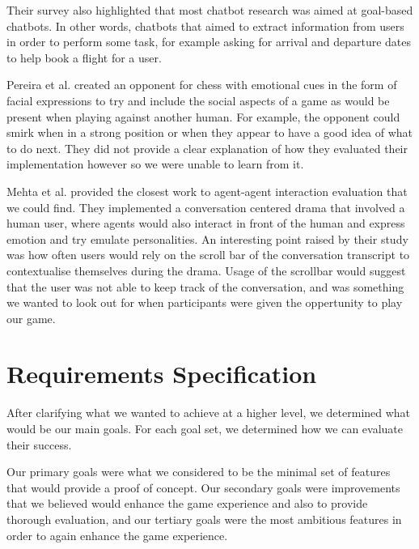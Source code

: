 \documentclass{article}
\begin{document}
Their survey also highlighted that most chatbot research was aimed at goal-based chatbots. In other words, chatbots that aimed to extract information from users in order to perform some task, for example asking for arrival and departure dates to help book a flight for a user. 

Pereira et al. \cite{pervchess} created an opponent for chess with emotional cues in the form of facial expressions to try and include the social aspects of a game as would be present when playing against another human. For example, the opponent could smirk when in a strong position or when they appear to have a good idea of what to do next. They did not provide a clear explanation of how they evaluated their implementation however so we were unable to learn from it. 

Mehta et al. \cite{convdrama} provided the closest work to agent-agent interaction evaluation that we could find. They implemented a conversation centered drama that involved a human user, where agents would also interact in front of the human and express emotion and try emulate personalities. An interesting point raised by their study was how often users would rely on the scroll bar of the conversation transcript to contextualise themselves during the drama. Usage of the scrollbar would suggest that the user was not able to keep track of the conversation, and was something we wanted to look out for when participants were given the oppertunity to play our game.

\clearpage
\section{Requirements Specification}

After clarifying what we wanted to achieve at a higher level, we determined what would be our main goals. For each goal set, we determined how we can evaluate their success. 

Our primary goals were what we considered to be the minimal set of features that would provide a proof of concept. Our secondary goals were improvements that we believed would enhance the game experience and also to provide thorough evaluation, and our tertiary goals were the most ambitious features in order to again enhance the game experience.
\end{document}
